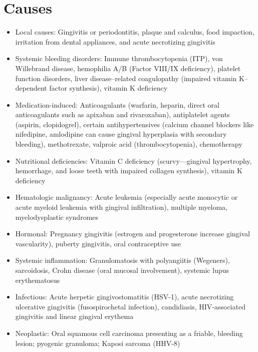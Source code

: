 \section*{Causes}
\begin{itemize}
 \item Local causes: Gingivitis or periodontitis, plaque and calculus, food impaction, irritation from dental appliances, and acute necrotizing gingivitis
 \item Systemic bleeding disorders: Immune thrombocytopenia (ITP), von Willebrand disease, hemophilia A/B (Factor VIII/IX deficiency), platelet function disorders, liver disease–related coagulopathy (impaired vitamin K–dependent factor synthesis), vitamin K deficiency
 \item Medication-induced: Anticoagulants (warfarin, heparin, direct oral anticoagulants such as apixaban and rivaroxaban), antiplatelet agents (aspirin, clopidogrel), certain antihypertensives (calcium channel blockers like nifedipine, amlodipine can cause gingival hyperplasia with secondary bleeding), methotrexate, valproic acid (thrombocytopenia), chemotherapy
 \item Nutritional deficiencies: Vitamin C deficiency (scurvy—gingival hypertrophy, hemorrhage, and loose teeth with impaired collagen synthesis), vitamin K deficiency
 \item Hematologic malignancy: Acute leukemia (especially acute monocytic or acute myeloid leukemia with gingival infiltration), multiple myeloma, myelodysplastic syndromes
 \item Hormonal: Pregnancy gingivitis (estrogen and progesterone increase gingival vascularity), puberty gingivitis, oral contraceptive use
 \item Systemic inflammation: Granulomatosis with polyangiitis (Wegeners), sarcoidosis, Crohn disease (oral mucosal involvement), systemic lupus erythematosus
 \item Infectious: Acute herpetic gingivostomatitis (HSV-1), acute necrotizing ulcerative gingivitis (fusospirochetal infection), candidiasis, HIV-associated gingivitis and linear gingival erythema
 \item Neoplastic: Oral squamous cell carcinoma presenting as a friable, bleeding lesion; pyogenic granuloma; Kaposi sarcoma (HHV-8)
\end{itemize}

